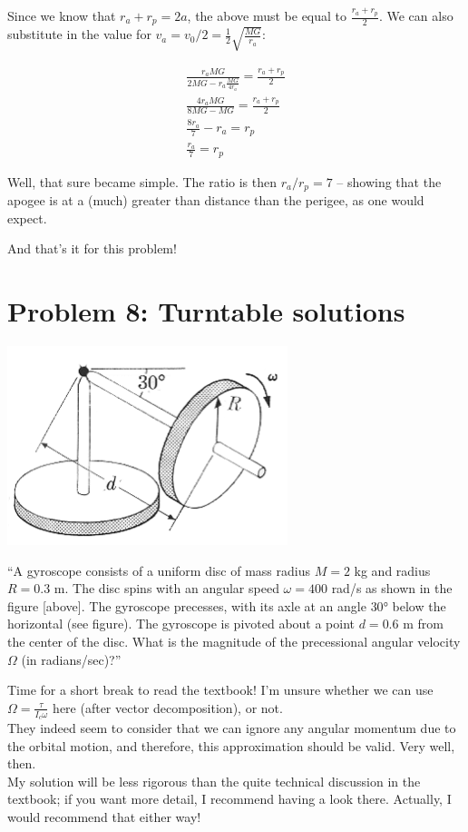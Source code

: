 \documentclass[8.01x]{subfiles}
\begin{document}
Since we know that $r_a + r_p = 2a$, the above must be equal to $\frac{r_a+r_p}{2}$. We can also substitute in the value for $v_a = v_0/2 = \frac{1}{2} \sqrt{\frac{M G}{r_a}}$:

\begin{align}
\frac{r_a M G}{2 M G - r_a \frac{M G}{4 r_a}} = \frac{r_a + r_p}{2}\\
\frac{4 r_a M G}{8 M G - M G} = \frac{r_a + r_p}{2}\\
\frac{8 r_a}{7} - r_a = r_p\\
\frac{r_a}{7} = r_p
\end{align}

Well, that sure became simple. The ratio is then $r_a/r_p = 7$ -- showing that the apogee is at a (much) greater than distance than the perigee, as one would expect.

And that's it for this problem!

\section{Problem 8: Turntable solutions}

\begin{center}
\includegraphics[scale=1.2]{Graphics/h8p8}
\end{center}

``A gyroscope consists of a uniform disc of mass radius $M = 2$ kg and radius $R = 0.3$ m. The disc spins with an angular speed $\omega = 400$ rad/s as shown in the figure [above]. The gyroscope precesses, with its axle at an angle $\ang{30}$ below the horizontal (see figure). The gyroscope is pivoted about a point $d = 0.6$ m from the center of the disc. What is the magnitude of the precessional angular velocity $\Omega$ (in radians/sec)?''

Time for a short break to read the textbook! I'm unsure whether we can use $\displaystyle \Omega = \frac{\tau}{I_c \omega}$ here (after vector decomposition), or not.\\
They indeed seem to consider that we can ignore any angular momentum due to the orbital motion, and therefore, this approximation should be valid. Very well, then.\\
My solution will be less rigorous than the quite technical discussion in the textbook; if you want more detail, I recommend having a look there. Actually, I would recommend that either way!
\end{document}
